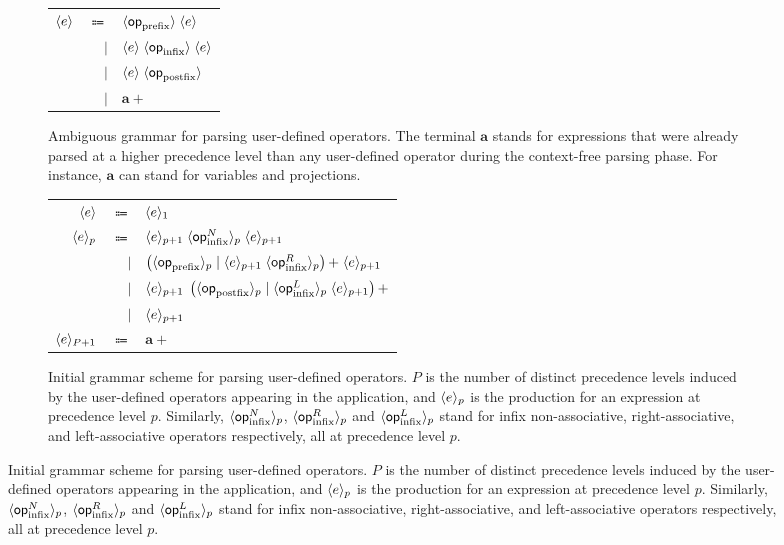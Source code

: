 {\newcommand{\prefix}{\mathsf{op}_{\text{prefix}}}
\newcommand{\infix}{\mathsf{op}_{\text{infix}}}
\newcommand{\infixl}{\mathsf{op}_{\text{infix}}^L}
\newcommand{\infixr}{\mathsf{op}_{\text{infix}}^R}
\newcommand{\infixn}{\mathsf{op}_{\text{infix}}^N}
\newcommand{\postfix}{\mathsf{op}_{\text{postfix}}}
\begin{figure}[H]
\begin{subfigure}{\linewidth}
\centering
\begin{tabular}{rrl}
$ \langle e\rangle $ & $ \Coloneqq $ & $ \angled{\prefix} \; \angled{e} $\\
& $ \mid $ & $ \angled{e} \; \angled{\infix} \; \angled{e} $\\
& $ \mid $ & $ \angled{e} \; \angled{\postfix} $\\
& $ \mid $ & $ \mathbf{a}+ $
\end{tabular}
\caption{Ambiguous grammar for parsing user-defined operators. The terminal $ \mathbf{a} $ stands for expressions that were already parsed at a higher precedence level than any user-defined operator during the context-free parsing phase.
For instance, $ \mathbf{a} $ can stand for variables and projections.}
\label{figure:user-defined-operators-initial-grammar}
\end{subfigure}
\par\bigskip
\begin{subfigure}{\linewidth}
\centering
\begin{tabular}{rrl}
$ \langle e\rangle $ & $ \Coloneqq $ & $ \langle e\rangle_1 $\\
$ \langle e\rangle_p $ & $ \Coloneqq $ & $ \angled{e}_{p + 1} \; \angled{\infixn}_p \; \angled{e}_{p + 1} $\\
& $ \mid $ & $ \left(\angled{\prefix}_p \mid \angled{e}_{p + 1} \; \angled{\infixr}_p\right){+} \; \angled{e}_{p + 1} $\\
& $ \mid $ & $ \angled{e}_{p + 1} \; \left(\angled{\postfix}_p \mid \angled{\infixl}_p \; \angled{e}_{p + 1}\right){+} $\\
& $ \mid $ & $ \langle e\rangle_{p + 1} $\\
$ \langle e\rangle_{P + 1} $ & $ \Coloneqq $ & $ \mathbf{a}+ $
\end{tabular}
\caption{%
Initial grammar scheme for parsing user-defined operators.
$ P $ is the number of distinct precedence levels induced by the user-defined operators appearing in the application, and $ \langle e\rangle_p $ is the production for an expression at precedence level $ p $.
Similarly, $ \angled{\infixn}_p $, $ \angled{\infixr}_p $ and $ \angled{\infixl}_p $ stand for infix non-associative, right-associative, and left-associative operators respectively, all at precedence level $ p $.
}
\end{subfigure}
\end{figure}}
